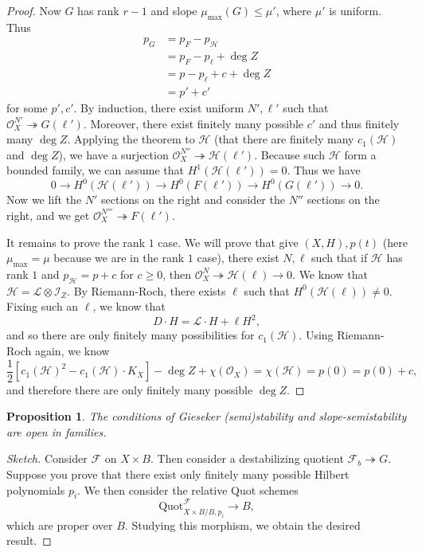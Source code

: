 \documentclass[leqno, openany]{memoir}
\newtheorem{prop}[thm]{Proposition}
\theoremstyle{definition}
\theoremstyle{remark}
\theoremstyle{plain}
\theoremstyle{definition}
\theoremstyle{remark}
\newcommand{\mc}[1]{\mathcal{#1}}
\newcommand{\mr}[1]{\mathrm{#1}}
\begin{document}
\begin{proof}
    Now $G$ has rank $r-1$ and slope $\mu_{\mr{max}}(G) \leq \mu'$, where $\mu'$ is uniform. Thus
    \begin{align*}
        p_G &= p_F - p_{\mc{H}} \\
        &= p_F - p_{\ell} + \deg Z \\
        &= p - p_{\ell} + c + \deg Z \\
        &= p' + c'
    \end{align*}
    for some $p', c'$. By induction, there exist uniform $N', \ell'$ such that $\mc{O}_X^{N'} \twoheadrightarrow G(\ell')$. Moreover, there exist finitely many possible $c'$ and thus finitely many $\deg Z$. Applying the theorem to $\mc{H}$ (that there are finitely many $c_1(\mc{H})$ and $\deg Z$), we have a surjection $\mc{O}_X^{N''} \twoheadrightarrow \mc{H}(\ell')$. Because such $\mc{H}$ form a bounded family, we can assume that $H^1(\mc{H}(\ell')) = 0$. Thus we have 
    \[ 0 \to H^0(\mc{H}(\ell')) \to H^0(F(\ell')) \to H^0(G(\ell')) \to 0. \]
    Now we lift the $N'$ sections on the right and consider the $N''$ sections on the right, and we get $\mc{O}_X^{N'''} \twoheadrightarrow F(\ell')$.

    It remains to prove the rank $1$ case. We will prove that give $(X, H), p(t)$ (here $\mu_{\mr{max}} = \mu$ because we are in the rank $1$ case), there exist $N, \ell$ such that if $\mc{H}$ has rank $1$ and $p_{\mc{H}} = p + c$ for $c \geq 0$, then $\mc{O}_X^N \twoheadrightarrow \mc{H}(\ell) \to 0$. We know that $\mc{H} = \mc{L} \otimes \mc{I}_Z$. By Riemann-Roch, there exists $\ell$ such that $H^0(\mc{H}(\ell)) \neq 0$. Fixing such an $\ell$, we know that
    \[ D \cdot H = \mc{L} \cdot H + \ell H^2, \]
    and so there are only finitely many possibilities for $c_1(\mc{H})$. Using Riemann-Roch again, we know
    \[ \frac{1}{2} [c_1(\mc{H})^2 - c_1(\mc{H}) \cdot K_X] - \deg Z + \chi(\mc{O}_X) = \chi(\mc{H}) = p(0) = p(0) + c, \]
    and therefore there are only finitely many possible $\deg Z$.
\end{proof}

\begin{prop}
    The conditions of Gieseker (semi)stability and slope-semistability are open in families.
\end{prop}

\begin{proof}[Sketch]
    Consider $\mc{F}$ on $X \times B$. Then consider a destabilizing quotient $\mc{F}_b \twoheadrightarrow G$. Suppose you prove that there exist only finitely many possible Hilbert polynomials $p_i$. We then consider the relative Quot schemes
    \[ \mr{Quot}_{X \times B / B, p_i}^{\mc{F}} \to B, \]
    which are proper over $B$. Studying this morphism, we obtain the desired result.
\end{proof}
\end{document}
